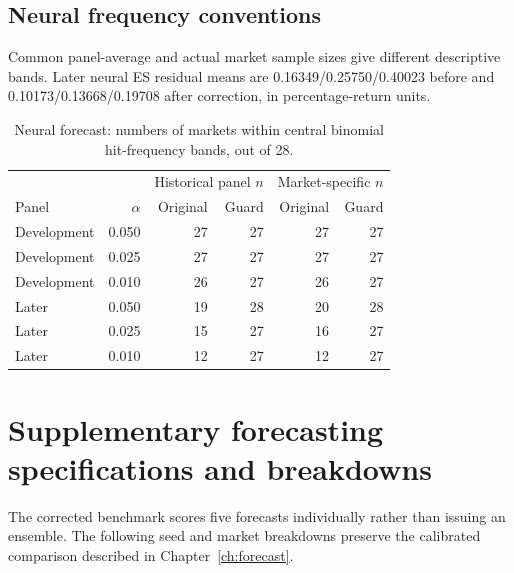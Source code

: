\subsection{Neural frequency conventions}

Common panel-average and actual market sample sizes give different descriptive bands. Later neural ES residual means are 0.16349/0.25750/0.40023 before and 0.10173/0.13668/0.19708 after correction, in percentage-return units.

\begin{table}[htbp]
\centering
\caption[Neural exceedance-frequency diagnostics]{Neural forecast: numbers of markets within central binomial hit-frequency bands, out of 28.}
\label{tab:tail-coverage-audit}
\small
\begin{tabular}{lrrrrr}
\toprule
 & & \multicolumn{2}{c}{Historical panel $n$} & \multicolumn{2}{c}{Market-specific $n$}\\
Panel & $\alpha$ & Original & Guard & Original & Guard\\
\midrule
Development & 0.050 & 27 & 27 & 27 & 27\\
Development & 0.025 & 27 & 27 & 27 & 27\\
Development & 0.010 & 26 & 27 & 26 & 27\\
Later & 0.050 & 19 & 28 & 20 & 28\\
Later & 0.025 & 15 & 27 & 16 & 27\\
Later & 0.010 & 12 & 27 & 12 & 27\\
\bottomrule
\end{tabular}
\end{table}



\section{Supplementary forecasting specifications and breakdowns}
\label{sec:supplementary-forecasting}

The corrected benchmark scores five forecasts individually rather than issuing an ensemble. The following seed and market breakdowns preserve the calibrated comparison described in Chapter~\ref{ch:forecast}.

